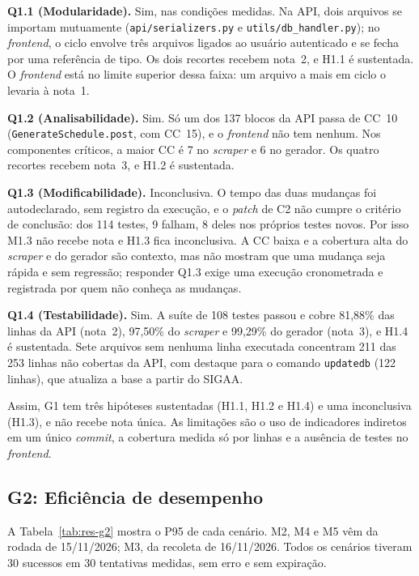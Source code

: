 \documentclass[12pt]{article}
\begin{document}
\textbf{Q1.1 (Modularidade).} Sim, nas condições medidas. Na API, dois arquivos se
importam mutuamente (\texttt{api/serializers.py} e \texttt{utils/db\_handler.py});
no \textit{frontend}, o ciclo envolve três arquivos ligados ao usuário autenticado
e se fecha por uma referência de tipo. Os dois recortes recebem nota~2, e H1.1 é
sustentada. O \textit{frontend} está no limite superior dessa faixa: um arquivo a
mais em ciclo o levaria à nota~1.

\textbf{Q1.2 (Analisabilidade).} Sim. Só um dos 137 blocos da API passa de
CC~10 (\texttt{GenerateSchedule.post}, com CC~15), e o \textit{frontend} não tem
nenhum. Nos componentes críticos, a maior CC é 7 no \textit{scraper} e 6 no
gerador. Os quatro recortes recebem nota~3, e H1.2 é sustentada.

\textbf{Q1.3 (Modificabilidade).} Inconclusiva. O tempo das duas mudanças foi
autodeclarado, sem registro da execução, e o \textit{patch} de C2 não cumpre o
critério de conclusão: dos 114 testes, 9 falham, 8 deles nos próprios testes
novos. Por isso M1.3 não recebe nota e H1.3 fica inconclusiva. A CC baixa e a
cobertura alta do \textit{scraper} e do gerador são contexto, mas não mostram que
uma mudança seja rápida e sem regressão; responder Q1.3 exige uma execução
cronometrada e registrada por quem não conheça as mudanças.

\textbf{Q1.4 (Testabilidade).} Sim. A suíte de 108 testes passou e cobre 81,88\%
das linhas da API (nota~2), 97,50\% do \textit{scraper} e 99,29\% do gerador
(nota~3), e H1.4 é sustentada. Sete arquivos sem nenhuma linha executada
concentram 211 das 253 linhas não cobertas da API, com destaque para o comando
\texttt{updatedb} (122 linhas), que atualiza a base a partir do SIGAA.

Assim, G1 tem três hipóteses sustentadas (H1.1, H1.2 e H1.4) e uma inconclusiva
(H1.3), e não recebe nota única. As limitações são o uso de indicadores
indiretos em um único \textit{commit}, a cobertura medida só por linhas e a
ausência de testes no \textit{frontend}.

\subsection{G2: Eficiência de desempenho}\label{subsec:res-g2}

A Tabela~\ref{tab:res-g2} mostra o P95 de cada cenário. M2, M4 e M5 vêm da rodada
de 15/11/2026; M3, da recoleta de 16/11/2026. Todos os cenários tiveram 30
sucessos em 30 tentativas medidas, sem erro e sem expiração.
\end{document}
